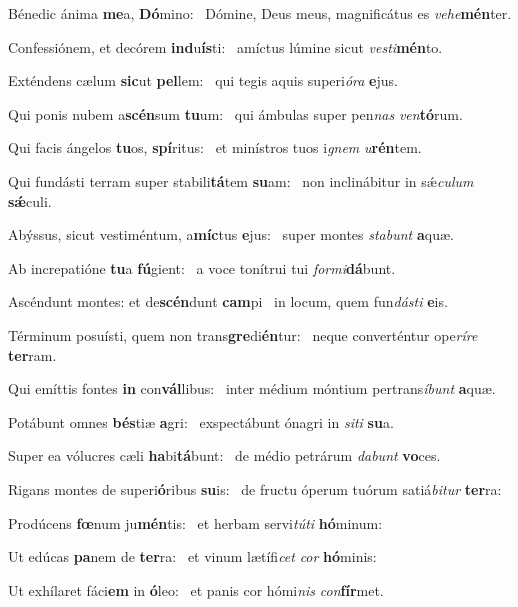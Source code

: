 \item Bénedic ánima \textbf{me}a, \textbf{Dó}mino:~\psstar{} Dómine, Deus meus, magnificátus es \textit{vehe}\textbf{mén}ter.
\item Confessiónem, et decórem \textbf{ind}u\textbf{ís}ti:~\psstar{} amíctus lúmine sicut \textit{vesti}\textbf{mén}to.
\item Exténdens cælum \textbf{sic}ut \textbf{pel}lem:~\psstar{} qui tegis aquis superi\textit{óra} \textbf{e}jus.
\item Qui ponis nubem a\textbf{scén}sum \textbf{tu}um:~\psstar{} qui ámbulas super pen\textit{nas} \textit{ven}\textbf{tó}rum.
\item Qui facis ángelos \textbf{tu}os, \textbf{spí}ritus:~\psstar{} et minístros tuos i\textit{gnem} \textit{u}\textbf{rén}tem.
\item Qui fundásti terram super stabili\textbf{tá}tem \textbf{su}am:~\psstar{} non inclinábitur in sǽ\textit{culum} \textbf{sǽ}culi.
\item Abýssus, sicut vestiméntum, a\textbf{míc}tus \textbf{e}jus:~\psstar{} super montes \textit{stabunt} \textbf{a}quæ.
\item Ab increpatióne \textbf{tu}a \textbf{fú}gient:~\psstar{} a voce tonítrui tui \textit{formi}\textbf{dá}bunt.
\item Ascéndunt montes: et de\textbf{scén}dunt \textbf{cam}pi~\psstar{} in locum, quem fun\textit{dásti} \textbf{e}is.
\item Términum posuísti, quem non trans\textbf{gre}di\textbf{én}tur:~\psstar{} neque converténtur ope\textit{ríre} \textbf{ter}ram.
\item Qui emíttis fontes \textbf{in} con\textbf{vál}libus:~\psstar{} inter médium móntium pertrans\textit{íbunt} \textbf{a}quæ.
\item Potábunt omnes \textbf{bés}tiæ \textbf{a}gri:~\psstar{} exspectábunt ónagri in \textit{siti} \textbf{su}a.
\item Super ea vólucres cæli \textbf{ha}bi\textbf{tá}bunt:~\psstar{} de médio petrárum \textit{dabunt} \textbf{vo}ces.
\item Rigans montes de superi\textbf{ó}ribus \textbf{su}is:~\psstar{} de fructu óperum tuórum satiá\textit{bitur} \textbf{ter}ra:
\item Prodúcens \textbf{fœ}num ju\textbf{mén}tis:~\psstar{} et herbam servi\textit{túti} \textbf{hó}minum:
\item Ut edúcas \textbf{pa}nem de \textbf{ter}ra:~\psstar{} et vinum lætífi\textit{cet} \textit{cor} \textbf{hó}minis:
\item Ut exhílaret fáci\textbf{em} in \textbf{ó}leo:~\psstar{} et panis cor hómi\textit{nis} \textit{con}\textbf{fír}met.
